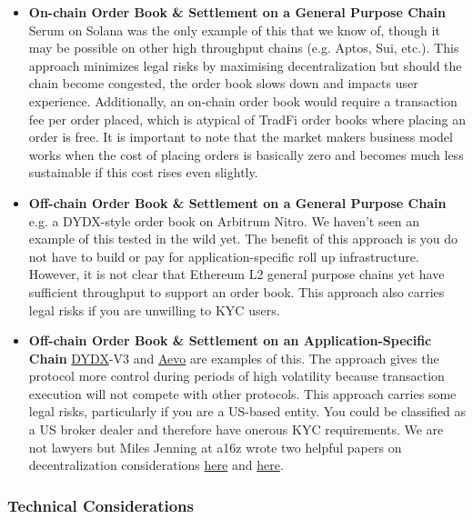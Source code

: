 \documentclass{article}
\begin{document}
\begin{itemize}
    \item \textbf{On-chain Order Book \& Settlement on a General Purpose Chain} \quad Serum on Solana was the only example of this that we know of, though it may be possible on other high throughput chains (e.g. Aptos, Sui, etc.). This approach minimizes legal risks by maximising decentralization but should the chain become congested, the order book slows down and impacts user experience. Additionally, an on-chain order book would require a transaction fee per order placed, which is atypical of TradFi order books where placing an order is free. It is important to note that the market makers business model works when the cost of placing orders is basically zero and becomes much less sustainable if this cost rises even slightly.
    \item \textbf{Off-chain Order Book \& Settlement on a General Purpose Chain} \quad e.g. a DYDX-style order book on Arbitrum Nitro. We haven't seen an example of this tested in the wild yet. The benefit of this approach is you do not have to build or pay for application-specific roll up infrastructure. However, it is not clear that Ethereum L2 general purpose chains yet have sufficient throughput to support an order book. This approach also carries legal risks if you are unwilling to KYC users.
    \item \textbf{Off-chain Order Book \& Settlement on an Application-Specific Chain} \quad \href{https://twitter.com/dYdX}{DYDX}-V3 and \href{https://twitter.com/aevoxyz}{Aevo} are examples of this. The approach gives the protocol more control during periods of high volatility because transaction execution will not compete with other protocols. This approach carries some legal risks, particularly if you are a US-based entity. You could be classified as a US broker dealer and therefore have onerous KYC requirements. We are not lawyers but Miles Jenning at a16z wrote two helpful papers on decentralization considerations \href{https://a16zcrypto.com/wp-content/uploads/2022/06/dao-legal-framework-part-1.pdf}{here} and \href{https://a16zcrypto.com/wp-content/uploads/2022/06/dao-legal-framework-part-2.pdf}{here}.   
\end{itemize}

\subsubsection{Technical Considerations} 
\end{document}
